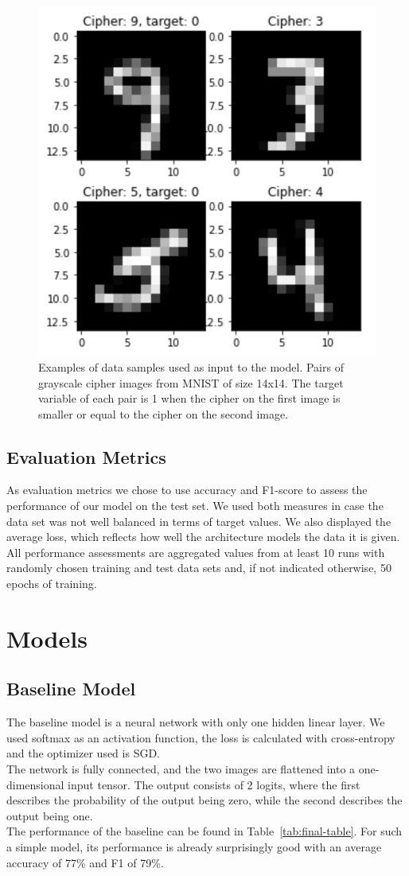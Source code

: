 \documentclass[10pt,conference,compsocconf]{IEEEtran}
\begin{document}
\begin{figure}[htbp]
  \centering
  \includegraphics[width=0.5\columnwidth]{doc/project1-report/example_ciphers.png}
  \vspace{-3mm}
  \caption{Examples of data samples used as input to the model. Pairs of grayscale cipher images from MNIST of size 14x14. The target variable of each pair is 1 when the cipher on the first image is smaller or equal to the cipher on the second image.}
  \label{fig:example-ciphers}
\end{figure}


\subsection{Evaluation Metrics}\label{subsec:evaluation-metrics}
As evaluation metrics we chose to use accuracy and F1-score to assess the performance of our model on the test set. We used both measures in case the data set was not well balanced in terms of target values. We also displayed the average loss, which reflects how well the architecture models the data it is given. All performance assessments are aggregated values from at least 10 runs with randomly chosen training and test data sets and, if not indicated otherwise, 50 epochs of training. 

\section{Models}\label{sec:models}
\subsection{Baseline Model}
\label{subsec:baseline-model}
The baseline model is a neural network with only one hidden linear layer. We used softmax as an activation function, the loss is calculated with cross-entropy and the optimizer used is SGD.\\
The network is fully connected, and the two images are flattened into a one-dimensional input tensor. The output consists of 2 logits, where the first describes the probability of the output being zero, while the second describes the output being one.\\
The performance of the baseline can be found in Table~\ref{tab:final-table}. For such a simple model, its performance is already surprisingly good with an average accuracy of 77\% and F1 of 79\%.
\end{document}
